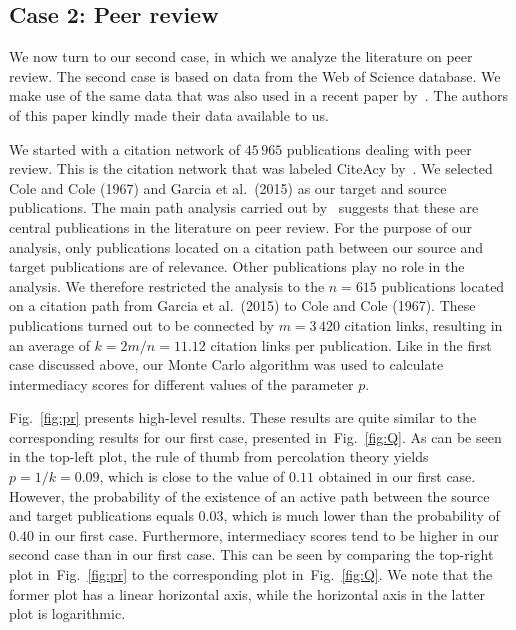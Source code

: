 \documentclass{article}
\theoremstyle{definition}
\newcommand{\figref}[1]{Fig.~\ref{fig:#1}\xspace}
\begin{document}
\subsection{\label{sec:pr}Case 2: Peer review}

We now turn to our second case, in which we analyze the literature on peer review. The second case is based on data from the Web of Science database. We make use of the same data that was also used in a recent paper by~\citet{Batagelj2017}. The authors of this paper kindly made their data available to us.

We started with a citation network of $45\,965$ publications dealing with peer review. This is the citation network that was labeled CiteAcy by~\citet{Batagelj2017}. We selected Cole and Cole (1967) and Garcia et al.\ (2015) as our target and source publications. The main path analysis carried out by~\citet{Batagelj2017} suggests that these are central publications in the literature on peer review. For the purpose of our analysis, only publications located on a citation path between our source and target publications are of relevance. Other publications play no role in the analysis. We therefore restricted the analysis to the $n = 615$ publications located on a citation path from Garcia et al.\ (2015) to Cole and Cole (1967). These publications turned out to be connected by $m = 3\,420$ citation links, resulting in an average of $k = 2m / n = 11.12$ citation links per publication. Like in the first case discussed above, our Monte Carlo algorithm was used to calculate intermediacy scores for different values of the parameter $p$.

\figref{pr} presents high-level results. These results are quite similar to the corresponding results for our first case, presented in~\figref{Q}. As can be seen in the top-left plot, the rule of thumb from percolation theory yields $p = 1 / k = 0.09$, which is close to the value of $0.11$ obtained in our first case. However, the probability of the existence of an active path between the source and target publications equals $0.03$, which is much lower than the probability of $0.40$ in our first case. Furthermore, intermediacy scores tend to be higher in our second case than in our first case. This can be seen by comparing the top-right plot in~\figref{pr} to the corresponding plot in~\figref{Q}. We note that the former plot has a linear horizontal axis, while the horizontal axis in the latter plot is logarithmic.
\end{document}
